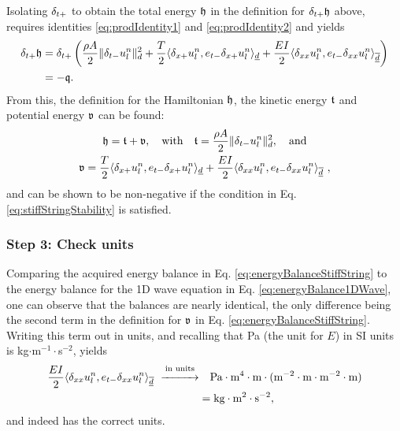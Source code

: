 {Isolating $\delta_{t+}$ to obtain the total energy $\mathfrak{h}$ in the definition for $\delta_{t+} \mathfrak{h}$ above, requires identities \eqref{eq:prodIdentity1} and \eqref{eq:prodIdentity2} and yields
\begin{equation*}
    \begin{aligned}
        \delta_{t+}\mathfrak{h} &= \delta_{t+}\left(\frac{\rho A}{2}\lVert\delta_{t-} u_l^n\rVert_d^2 + \frac{T}{2}\langle\delta_{x+}u_l^n, e_{t-}\delta_{x+}u_l^n\rangle_{\underline{d}} + \frac{EI}{2}\langle\delta_{xx}u_l^n, e_{t-}\delta_{xx}u_l^n\rangle_{\overline{\underline{d}}}\right) \\
        &=-\mathfrak{q}.
    \end{aligned}
\end{equation*}
From this, the definition for the Hamiltonian $\mathfrak{h}$, the kinetic energy $\mathfrak{t}$ and potential energy $\mathfrak{v}$ can be found:
\begin{equation}\label{eq:energyBalanceStiffString}
    \begin{gathered}
        \mathfrak{h} = \mathfrak{t} + \mathfrak{v}, \quad \text{with} \quad \mathfrak{t} = \frac{\rho A}{2}\lVert\delta_{t-} u_l^n\rVert^2_d,\quad \text{and} \\
        \mathfrak{v} = \frac{T}{2}\langle\delta_{x+}u_l^n, e_{t-}\delta_{x+}u_l^n\rangle_{\underline{d}} + \frac{EI}{2}\langle\delta_{xx}u_l^n, e_{t-}\delta_{xx}u_l^n\rangle_{\overline{\underline{d}}}\ ,
    \end{gathered}
\end{equation}
and can be shown to be non-negative if the condition in Eq. \eqref{eq:stiffStringStability} is satisfied.

\subsubsection{Step 3: Check units}
Comparing the acquired energy balance in Eq. \eqref{eq:energyBalanceStiffString} to the energy balance for the 1D wave equation in Eq. \eqref{eq:energyBalance1DWave}, one can observe that the balances are nearly identical, the only difference being the second term in the definition for $\mathfrak{v}$ in Eq. \eqref{eq:energyBalanceStiffString}. 
Writing this term out in units, and recalling that Pa (the unit for $E$) in SI units is kg$\cdot$m$^{-1}\cdot$s$^{-2}$, yields
\begin{align*}
    \frac{EI}{2}\langle\delta_{xx}u_l^n, e_{t-}\delta_{xx}u_l^n\rangle_{\overline{\underline{d}}}\ \overset{\text{in units}}{\xrightarrow{\hspace*{1cm}}}& \quad \text{Pa}\cdot \text{m}^4 \cdot \text{m} \cdot (\text{m}^{-2} \cdot \text{m} \cdot \text{m}^{-2} \cdot \text{m}) \\
    & = \text{kg} \cdot \text{m}^2 \cdot \text{s}^{-2},
\end{align*}
and indeed has the correct units. 

}

